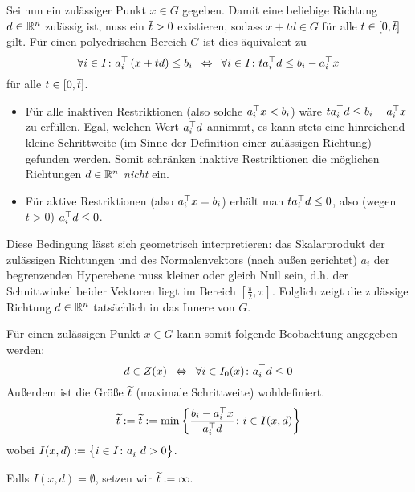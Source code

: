 
Sei nun ein zulässiger Punkt $x \in G$ gegeben. Damit eine beliebige Richtung $d \in \mathbb{R}^n$ zulässig ist, nuss ein $\overline{t} > 0$ existieren, sodass $x + td \in G$ für alle $t \in [0,\overline{t}]$ gilt.
Für einen polyedrischen Bereich $G$ ist dies äquivalent zu
\begin{equation*}
	\forall i \in I \colon a_i^{\top} \left( x + td \right) \le b_i \enskip \Leftrightarrow \enskip \forall i \in I \colon t a_i^{\top} d \le b_i - a_i^{\top} x
\end{equation*}
für alle $t \in [0,\overline{t}]$.

\begin{itemize}[nolistsep]%
	\item Für alle inaktiven Restriktionen (also solche $a_i^{\top} x < b_i$) wäre $t a_i^{\top} d \le b_i - a_i^{\top} x$ zu erfüllen. Egal, welchen Wert $a_i^{\top}d$ annimmt, es kann stets eine hinreichend kleine Schrittweite (im Sinne der Definition einer zulässigen Richtung) gefunden werden. Somit schränken inaktive Restriktionen die möglichen Richtungen $d \in \mathbb{R}^n$ \textit{nicht} ein.
	\item Für aktive Restriktionen (also $a_i^{\top} x = b_i$) erhält man $t a_i^{\top} d \le 0$, also (wegen $t > 0$) $a_i^{\top} d \le 0$.
\end{itemize}

Diese Bedingung lässt sich geometrisch interpretieren: 
das Skalarprodukt der zulässigen Richtungen und des Normalenvektors (nach außen gerichtet) $a_i$ der begrenzenden Hyperebene muss kleiner oder gleich Null sein, d.h. der Schnittwinkel beider Vektoren liegt im Bereich $[\frac{\pi}{2},\pi]$. Folglich zeigt die zulässige Richtung $d \in \mathbb{R}^n$ tatsächlich in das Innere von $G$.

Für einen zulässigen Punkt $x \in G$ kann somit folgende Beobachtung angegeben werden:
\begin{equation}
	d \in Z(x) \enskip \Leftrightarrow \enskip \forall i \in I_0(x) \colon a_i^{\top}d \le 0 \label{eq: 2.4}
\end{equation}
Außerdem ist die Größe $\widetilde{t}$ (maximale Schrittweite) wohldefiniert.
\begin{equation}
\widetilde{t} \mathrel{:=} \widetilde{t} \mathrel{:=} \min\left\{ \frac{b_i - a_i^{\top}x}{a_i^{\top}d} \colon i \in I(x,d) \right\} \label{eq: 2.5}
\end{equation}
wobei $I(x,d) \mathrel{:=} \left\{  i \in I \colon a_i^{\top}d > 0 \right\}$.

\begin{bemerkung} %
	Falls $I(x,d) = \emptyset$, setzen wir $\widetilde{t} \mathrel{:=} \infty$.
\end{bemerkung}

